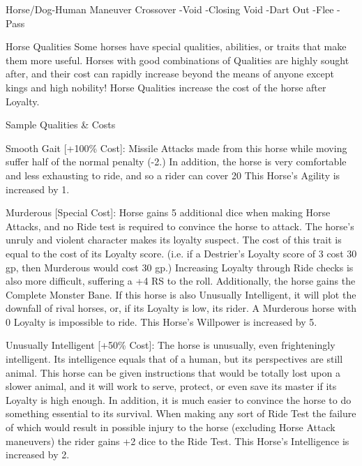 \documentclass[oneside,11pt,english]{book}
\begin{document}
 

Horse/Dog-Human Maneuver Crossover 
-Void 
-Closing Void 
-Dart Out 
-Flee 
-Pass 

 

Horse Qualities 
Some horses have special qualities, abilities, or traits that make them more useful. Horses with good 
combinations of Qualities are highly sought after, and their cost can rapidly increase beyond the means of 
anyone except kings and high nobility! 
Horse Qualities increase the cost of the horse after Loyalty. 

 

Sample Qualities \& Costs 

 

Smooth Gait [+100\% Cost]: Missile Attacks made from this horse while moving suffer half of the normal 
penalty (-2.) In addition, the horse is very comfortable and less exhausting to ride, and so a rider can 
cover 20%
This Horse’s Agility is increased by 1. 

 

Murderous [Special Cost]: Horse gains 5 additional dice when making Horse Attacks, and no Ride test is 
required to convince the horse to attack. The horse’s unruly and violent character makes its loyalty 
suspect. The cost of this trait is equal to the cost of its Loyalty score. (i.e. if a Destrier’s Loyalty score of 3 
cost 30 gp, then Murderous would cost 30 gp.) Increasing Loyalty through Ride checks is also more 
difficult, suffering a +4 RS to the roll. 
Additionally, the horse gains the Complete Monster Bane. If this horse is also Unusually Intelligent, it 
will plot the downfall of rival horses, or, if its Loyalty is low, its rider. A Murderous horse with 0 Loyalty 
is impossible to ride. 
This Horse’s Willpower is increased by 5. 

 

Unusually Intelligent [+50\% Cost]: The horse is unusually, even frighteningly intelligent. Its intelligence 
equals that of a human, but its perspectives are still animal. This horse can be given instructions that 
would be totally lost upon a slower animal, and it will work to serve, protect, or even save its master if its 
Loyalty is high enough. In addition, it is much easier to convince the horse to do something essential to its 
survival. When making any sort of Ride Test the failure of which would result in possible injury to the 
horse (excluding Horse Attack maneuvers) the rider gains +2 dice to the Ride Test. 
This Horse’s Intelligence is increased by 2. 
\end{document}
